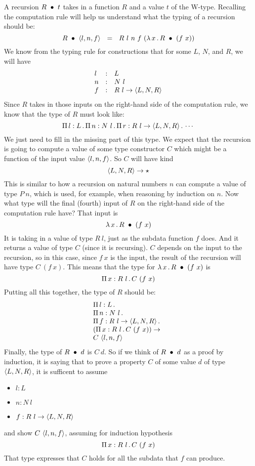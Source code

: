 \documentclass{article}
\begin{document}
A recursion $R\ \bullet\ t$ takes in a function $R$ and a value $t$ of the W-type.
Recalling the computation rule will help us understand what the typing of a recursion
should be:
\[
\wrec{R}{\ctora{l}{n}{f}} \ \ = \ \ R\ l\ n\ f\ (\lam{x}{\wrec{R}{(f\ x)}})
\]
\noindent We know from the typing rule for constructions that for some $L$, $N$, and $R$, we will have
\[
\begin{array}{lll}
  l & : & L \\
  n & : & N\ l \\
  f & : & R\ l \to \langle L , N , R \rangle
\end{array}
\]
\noindent Since $R$ takes in those inputs on the right-hand side of the computation rule,
we know that the type of $R$ must look like:
\[
\Pia{l}{L}{\Pia{n}{N\ l}{\Pia{r}{R\ l \to \w{L}{N}{R}}{\cdots}}}
\]
\noindent We just need to fill in the missing part of this type.  We expect that
the recursion is going to compute a value of some type constructor $C$ which might
be a function of the input value $\langle l , n, f \rangle$.  So $C$ will have kind
\[
\langle L , N , R \rangle \to \star
\]
\noindent This is similar to how a recursion on natural numbers $n$ can compute a value of type $P\ n$,
which is used, for example, when reasoning by induction on $n$.  Now what type will the final (fourth)
input of $R$ on the right-hand side of the computation rule have?  That input is
\[
\lambda\, x\, .\, R\ \bullet\ (f\ x)
\]
\noindent It is taking in a value of type $R\ l$, just as the subdata function $f$ does.  And it returns
a value of type $C$ (since it is recursing).  $C$ depends on the input to the recursion, so in this case,
since $f\ x$ is the input, the result of the recursion will have type $C\ (f\ x)$.  This means that the
type for $\lambda\, x\, .\, R\ \bullet\ (f\ x)$ is
\[
\Pi\, x: R\ l\, .\, C\ (f\ x)
\]
\noindent Putting all this together, the type of $R$ should be:
\[
\begin{array}{l}
  \Pi\, l: L\, .\, \ \\
  \Pi\, n: N\ l\, .\, \ \\
  \Pi\, f: R\ l \to \langle L , N , R \rangle\, .\, \  \\
  (\Pi\, x: R\ l\, .\, C\ (f\ x)) \to \\
  C\ \langle l , n, f \rangle
  \end{array}
\]
\noindent Finally, the type of $R\ \bullet\ d$ is $C\ d$.  So if we think of $R\ \bullet\ d$
as a proof by induction, it is saying that to prove a property $C$ of some value $d$ of
type $\langle L , N , R \rangle$, it is sufficent to assume

\begin{itemize}
\item $l : L$
\item $n : N\ l$
\item $f:R\ l \to \langle L , N , R \rangle$
\end{itemize}

\noindent and show $C\ \langle l , n, f \rangle$, assuming for induction hypothesis
\[
\Pi\, x: R\ l\, .\, C\ (f\ x)
\]
\noindent That type expresses that $C$ holds for all the subdata that $f$ can produce.



\end{document}
